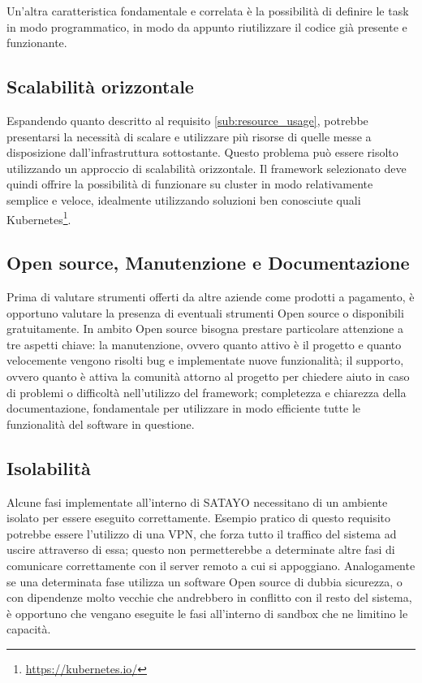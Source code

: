 Un'altra caratteristica fondamentale e correlata è la possibilità di definire le
task in modo programmatico, in modo da appunto riutilizzare il codice già presente
e funzionante.

\subsection{Scalabilità orizzontale}
\label{sub:scalable}

Espandendo quanto descritto al requisito \ref{sub:resource_usage}, potrebbe presentarsi
la necessità di scalare e utilizzare più risorse di quelle messe a disposizione dall'infrastruttura
sottostante. Questo problema può essere risolto utilizzando un approccio di
scalabilità orizzontale. Il framework selezionato deve quindi offrire la possibilità
di funzionare su cluster in modo relativamente semplice e veloce, idealmente
utilizzando soluzioni ben conosciute quali Kubernetes\footnote{\url{https://kubernetes.io/}}.

\subsection{Open source, Manutenzione e Documentazione}
\label{sub:open_source}

Prima di valutare strumenti offerti da altre aziende come prodotti a pagamento, è
opportuno valutare la presenza di eventuali strumenti Open source o disponibili gratuitamente.
In ambito Open source bisogna prestare particolare attenzione a tre aspetti
chiave: la manutenzione, ovvero quanto attivo è il progetto e quanto velocemente
vengono risolti bug e implementate nuove funzionalità; il supporto, ovvero
quanto è attiva la comunità attorno al progetto per chiedere aiuto in caso di
problemi o difficoltà nell'utilizzo del framework; completezza e chiarezza della
documentazione, fondamentale per utilizzare in modo efficiente tutte le
funzionalità del software in questione.

\subsection{Isolabilità}
\label{sub:isolation}

Alcune fasi implementate all'interno di SATAYO necessitano di un ambiente isolato
per essere eseguito correttamente. Esempio pratico di questo requisito potrebbe
essere l'utilizzo di una VPN, che forza tutto il traffico del sistema ad uscire attraverso
di essa; questo non permetterebbe a determinate altre fasi di comunicare
correttamente con il server remoto a cui si appoggiano. Analogamente se una determinata
fase utilizza un software Open source di dubbia sicurezza, o con dipendenze
molto vecchie che andrebbero in conflitto con il resto del sistema, è opportuno che
vengano eseguite le fasi all'interno di sandbox che ne limitino le capacità.

